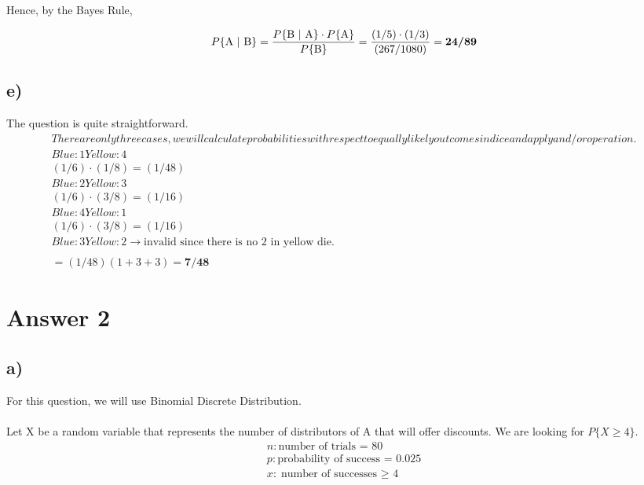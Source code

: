 \documentclass[12pt]{article}
\begin{document}
Hence, by the Bayes Rule, 

\begin{equation*}
    P\{\text{A } | \text{ B}\} = \frac{P\{\text{B } | \text{ A}\} \cdot P\{\text{A}\}}{P\{\text{B}\}} \\ 
    = \frac{(1/5) \cdot (1/3)}
                {(267/1080)} = \textbf{24/89}
\end{equation*}

\subsection*{e)} 
The question is quite straightforward.
\begin{align*}
There are only three cases, we will calculate probabilities with respect to equally likely outcomes in dice and apply and/or operation. \\

    Blue: 1 Yellow: 4 \\ (1/6) \cdot (1/8) = (1/48) \\

    Blue: 2 Yellow: 3 \\ (1/6) \cdot (3/8) = (1/16) \\

    Blue: 4 Yellow: 1 \\ (1/6) \cdot (3/8) = (1/16) \\

    Blue: 3 Yellow: 2 \rightarrow \text{invalid since there is no 2 in yellow die.} \\\\

    = (1/48) (1+3+3) = \textbf{7/48}
\end{align*}

\section*{Answer 2}

\subsection*{a)} 
For this question, we will use Binomial Discrete Distribution. \\\\

Let X be a random variable that represents the number of distributors of A that will offer discounts. We are looking for $P\{X \geq 4 \}$. \\
\begin{align*}
    n: \text{number of trials = 80} \\
    p: \text{probability of success = 0.025} \\
    x: \text{number of successes $\geq$ 4} \\
\end{align*}
\end{document}
